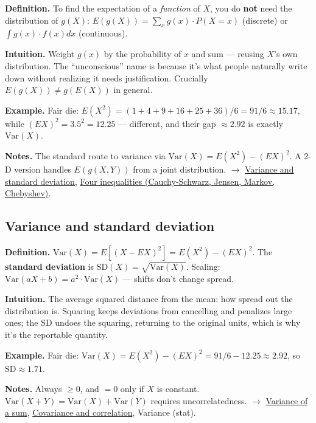 \documentclass[11pt,a4paper]{article}
\begin{document}
\textbf{Definition.} To find the expectation of a \textit{function} of $X$, you do \textbf{not} need the distribution of $g(X)$:
$E(g(X)) = \sum _x g(x)\cdot P(X = x)$ (discrete) or $\int  g(x)\cdot f(x) dx$ (continuous).

\textbf{Intuition.} Weight $g(x)$ by the probability of $x$ and sum --- reusing $X$'s own distribution. The ``unconscious'' name is because it's what people naturally write down without realizing it needs justification. Crucially $E(g(X)) \neq  g(E(X))$ in general.

\textbf{Example.} Fair die: $E(X^{2}) = (1+4+9+16+25+36)/6 = 91/6 \approx  15.17$, while $(E X)^{2} = 3.5^{2} = 12.25$ --- different, and their gap $\approx  2.92$ is exactly $\mathrm{Var}(X)$.

\textbf{Notes.} The standard route to variance via $\mathrm{Var}(X) = E(X^{2}) - (E X)^{2}$. A 2-D version handles $E(g(X,Y))$ from a joint distribution. $\to$ \hyperref[sec:variance-and-standard-deviation]{Variance and standard deviation}, \hyperref[sec:four-inequalities-cauchy-schwarz-jensen-markov-chebyshev]{Four inequalities (Cauchy-Schwarz, Jensen, Markov, Chebyshev)}.

\subsection{Variance and standard deviation}\label{sec:variance-and-standard-deviation}

\textbf{Definition.} $\mathrm{Var}(X) = E[(X - E X)^{2}] = E(X^{2}) - (E X)^{2}$. The \textbf{standard deviation} is $\mathrm{SD}(X) = \sqrt{\mathrm{Var}(X)}$. Scaling: $\mathrm{Var}(aX + b) = a^{2}\cdot \mathrm{Var}(X)$ --- shifts don't change spread.

\textbf{Intuition.} The average squared distance from the mean: how spread out the distribution is. Squaring keeps deviations from cancelling and penalizes large ones; the SD undoes the squaring, returning to the original units, which is why it's the reportable quantity.

\textbf{Example.} Fair die: $\mathrm{Var}(X) = E(X^{2}) - (E X)^{2} = 91/6 - 12.25 \approx  2.92$, so $\mathrm{SD} \approx  1.71$.

\textbf{Notes.} Always $\geq  0$, and $= 0$ only if $X$ is constant. $\mathrm{Var}(X + Y) = \mathrm{Var}(X) + \mathrm{Var}(Y)$ requires uncorrelatedness. $\to$ \hyperref[sec:variance-of-a-sum]{Variance of a sum}, \hyperref[sec:covariance-and-correlation]{Covariance and correlation}, Variance (stat).
\end{document}
